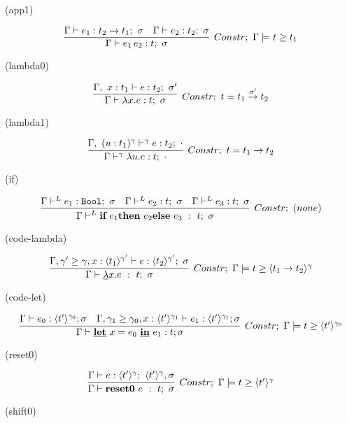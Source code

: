 (app1)

\[
  \infer[Constr;~\Gamma \models \longer{t}{t_1}]
  {\Gamma \vdash e_1 \, e_2 : t;~\sigma}
  {\Gamma \vdash e_1 : t_2 \to t_1;~\sigma
    &\Gamma \vdash e_2 : t_2;~\sigma
  }
\]

(lambda0)

\[
  \infer[Constr;~t=\funT{t_1}{t_2}{\sigma'}]
  {\Gamma \vdash \lambda x.e : t;~\sigma}
  {\Gamma,~x:t_1 \vdash e : t_2;~\sigma'}
\]

(lambda1)

\[
  \infer[Constr;~t=\funT{t_1}{t_2}{}]
  {\Gamma \vdash^\gamma \lambda u.e : t;~\cdot}
  {\Gamma,~(u:t_1)^\gamma \vdash^\gamma e : t_2;~\cdot}
\]

(if)

\[
  \infer[Constr;~(none)]
  {\Gamma \vdash^L
    \textbf{if}~e_1 \textbf{then}~e_2 \textbf{else}~e_3 ~:~t; ~ \sigma}
  {\Gamma \vdash^L e_1 : \Bool;~\sigma
    &\Gamma \vdash^L e_2 : t;~\sigma
    &\Gamma \vdash^L e_3 : t;~\sigma
  }
\]

(code-lambda)

\[
  \infer[Constr;~\Gamma \models \longer{t}{\codeT{t_1 \to t_2}{\gamma}}]
  {\Gamma \vdash \underline{\lambda}x.e ~:~t;~\sigma}
  {\Gamma,\longer{\gamma'}{\gamma},x:\codeT{t_1}{\gamma'}
    \vdash e : \codeT{t_2}{\gamma'};~\sigma
  }
\]

(code-let)

\[
  \infer[Constr;~\Gamma \models \longer{t}{\codeT{t'}{\gamma_0}}]
  {\Gamma \vdash \cLet~ x = e_0~ \cIn~ e_1 : t ; \sigma}
  { \Gamma \vdash e_0 : \codeT{t'}{\gamma_0} ; \sigma
    &\Gamma, \longer{\gamma_1}{\gamma_0}, x: \codeT{t'}{\gamma_1} \vdash e_1 : \codeT{t'}{\gamma_1} ; \sigma
  }
\]

(reset0)

\[
  \infer[Constr;~\Gamma \models \longer{t}{\codeT{t'}{\gamma}}]
  {\Gamma \vdash \Resetz~e ~:~ t; ~\sigma}
  {\Gamma \vdash e:\codeT{t'}{\gamma};~\codeT{t'}{\gamma},\sigma
  }
\]

(shift0)


